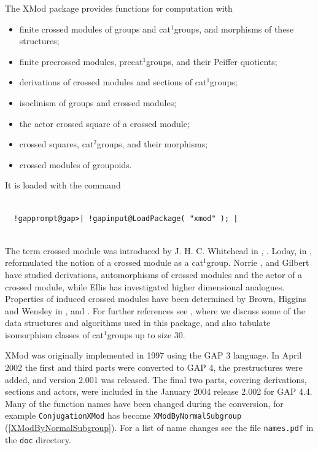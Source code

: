 \documentclass[a4paper,11pt]{report}
\begin{document}
{
  The \textsf{XMod} package provides functions for computation with 
\begin{itemize}
\item  finite crossed modules of groups and cat$^1$\texttt{}groups, and morphisms of these structures; 
\item  finite pre\texttt{}crossed modules, pre\texttt{}cat$^1$\texttt{}groups, and their Peiffer quotients; 
\item  derivations of crossed modules and sections of cat$^1$\texttt{}groups; 
\item  isoclinism of groups and crossed modules; 
\item  the actor crossed square of a crossed module; 
\item  crossed squares, cat$^2$\texttt{}groups, and their morphisms; 
\item  crossed modules of groupoids. 
\end{itemize}
 It is loaded with the command 
\begin{Verbatim}[commandchars=!@|,fontsize=\small,frame=single,label=Example]
  
  !gapprompt@gap>| !gapinput@LoadPackage( "xmod" ); |
  
\end{Verbatim}
 

 The term crossed module was introduced by J. H. C. Whitehead in \cite{W2}, \cite{W1}. Loday, in \cite{L1}, reformulated the notion of a crossed module as a cat$^1$\texttt{}group. Norrie \cite{N1}, \cite{N2} and Gilbert \cite{G1} have studied derivations, automorphisms of crossed modules and the actor of a
crossed module, while Ellis \cite{E1} has investigated higher dimensional analogues. Properties of induced crossed
modules have been determined by Brown, Higgins and Wensley in \cite{BH1}, \cite{BW1} and \cite{BW2}. For further references see \cite{AW1}, where we discuss some of the data structures and algorithms used in this
package, and also tabulate isomorphism classes of cat$^1$\texttt{}groups up to size $30$. 

 \textsf{XMod} was originally implemented in 1997 using the \textsf{GAP} 3 language. In April 2002 the first and third parts were converted to \textsf{GAP} 4, the pre\texttt{}structures were added, and version 2.001 was
released. The final two parts, covering derivations, sections and actors, were
included in the January 2004 release 2.002 for \textsf{GAP} 4.4. Many of the function names have been changed during the conversion, for
example \texttt{ConjugationXMod} has become \texttt{XModByNormalSubgroup} (\ref{XModByNormalSubgroup}). For a list of name changes see the file \texttt{names.pdf} in the \texttt{doc} directory. 

}
\end{document}
